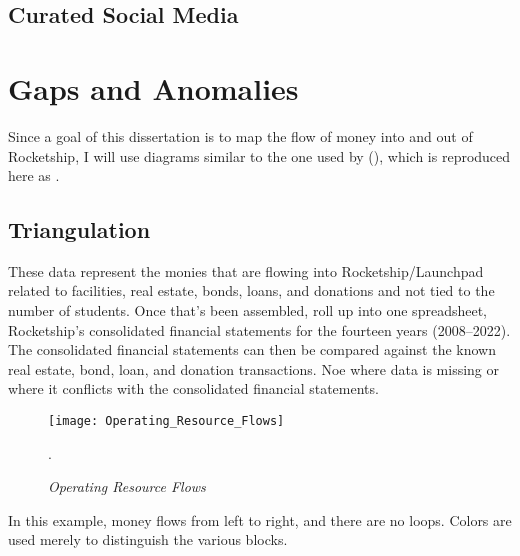 \subsection{Curated Social Media}\label{sec:findings-curated-social-media}\indent


\section{Gaps and Anomalies}\label{sec:findings-gaps-anomolies}\indent

Since a goal of this dissertation is to map the flow of money into and out of Rocketship, I will use diagrams similar to the one used by \citeauthor{Baker.Miron2015} (\citeyear{Baker.Miron2015}), which is reproduced here as .

\subsection{Triangulation}\label{sec:findings-triangulation}\indent

These data represent the monies that are flowing into Rocketship/Launchpad related to facilities, real estate, bonds, loans, and donations and not tied to the number of students. Once that's been assembled, roll up into one spreadsheet, Rocketship's consolidated financial statements for the fourteen years (2008--2022). The consolidated financial statements can then be compared against the known real estate, bond, loan, and donation transactions. Noe where data is missing or where it conflicts with the consolidated financial statements.

\begin{figure}[ht]
  \centering
  \caption[Operating Resource Flows]{\textit{Operating Resource Flows}}\label{fig:opresflows}
  \texttt{[image: Operating\_Resource\_Flows]}\\
  \footnotesize\raggedright\textcite[16]{Baker.Miron2015}.
\end{figure}
In this example, money flows from left to right, and there are no loops. Colors are used merely to distinguish the various blocks.


